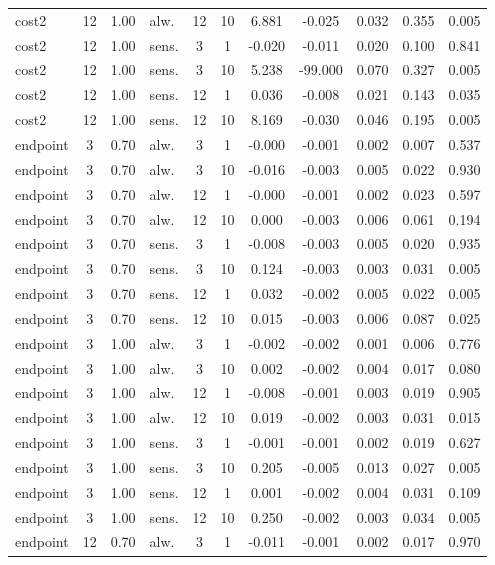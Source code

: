 \begin{scriptsize}
\begin{longtable}{l cclcc ccccc}
cost2 & 12 & 1.00 & alw. & 12 & 10 & 6.881 & -0.025 & 0.032 & 0.355 & 0.005 \\
cost2 & 12 & 1.00 & sens. & 3 & 1 & -0.020 & -0.011 & 0.020 & 0.100 & 0.841 \\
cost2 & 12 & 1.00 & sens. & 3 & 10 & 5.238 & -99.000 & 0.070 & 0.327 & 0.005 \\
cost2 & 12 & 1.00 & sens. & 12 & 1 & 0.036 & -0.008 & 0.021 & 0.143 & 0.035 \\
cost2 & 12 & 1.00 & sens. & 12 & 10 & 8.169 & -0.030 & 0.046 & 0.195 & 0.005 \\
endpoint & 3 & 0.70 & alw. & 3 & 1 & -0.000 & -0.001 & 0.002 & 0.007 & 0.537 \\
endpoint & 3 & 0.70 & alw. & 3 & 10 & -0.016 & -0.003 & 0.005 & 0.022 & 0.930 \\
endpoint & 3 & 0.70 & alw. & 12 & 1 & -0.000 & -0.001 & 0.002 & 0.023 & 0.597 \\
endpoint & 3 & 0.70 & alw. & 12 & 10 & 0.000 & -0.003 & 0.006 & 0.061 & 0.194 \\
endpoint & 3 & 0.70 & sens. & 3 & 1 & -0.008 & -0.003 & 0.005 & 0.020 & 0.935 \\
endpoint & 3 & 0.70 & sens. & 3 & 10 & 0.124 & -0.003 & 0.003 & 0.031 & 0.005 \\
endpoint & 3 & 0.70 & sens. & 12 & 1 & 0.032 & -0.002 & 0.005 & 0.022 & 0.005 \\
endpoint & 3 & 0.70 & sens. & 12 & 10 & 0.015 & -0.003 & 0.006 & 0.087 & 0.025 \\
endpoint & 3 & 1.00 & alw. & 3 & 1 & -0.002 & -0.002 & 0.001 & 0.006 & 0.776 \\
endpoint & 3 & 1.00 & alw. & 3 & 10 & 0.002 & -0.002 & 0.004 & 0.017 & 0.080 \\
endpoint & 3 & 1.00 & alw. & 12 & 1 & -0.008 & -0.001 & 0.003 & 0.019 & 0.905 \\
endpoint & 3 & 1.00 & alw. & 12 & 10 & 0.019 & -0.002 & 0.003 & 0.031 & 0.015 \\
endpoint & 3 & 1.00 & sens. & 3 & 1 & -0.001 & -0.001 & 0.002 & 0.019 & 0.627 \\
endpoint & 3 & 1.00 & sens. & 3 & 10 & 0.205 & -0.005 & 0.013 & 0.027 & 0.005 \\
endpoint & 3 & 1.00 & sens. & 12 & 1 & 0.001 & -0.002 & 0.004 & 0.031 & 0.109 \\
endpoint & 3 & 1.00 & sens. & 12 & 10 & 0.250 & -0.002 & 0.003 & 0.034 & 0.005 \\
endpoint & 12 & 0.70 & alw. & 3 & 1 & -0.011 & -0.001 & 0.002 & 0.017 & 0.970 \\

\end{longtable}
\end{scriptsize}

